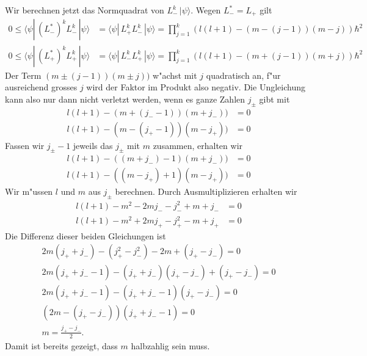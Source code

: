 Wir berechnen jetzt das Normquadrat von $L_-^k\,|\psi\rangle$. Wegen
$L_-^*=L_+$ gilt
\begin{align*}
0
\le
\langle\psi|\, (L_-^*)^kL_-^k\,|\psi\rangle
&=
\langle\psi|\, L_+^kL_-^k\,|\psi\rangle
=
\prod_{j=1}^k(l(l+1)-(m-(j-1))(m-j))\hbar^2
\\
0
\le
\langle\psi|\, (L_+^*)^kL_+^k\,|\psi\rangle
&=
\langle\psi|\, L_-^kL_+^k\,|\psi\rangle
=
\prod_{j=1}^k(l(l+1)-(m+(j-1))(m+j))\hbar^2
\end{align*}
Der Term $(m\pm (j-1))(m\pm j))$ w"achst mit $j$ quadratisch an, 
f"ur ausreichend grosses $j$ wird der Faktor im Produkt also negativ.
Die Ungleichung kann also nur dann nicht verletzt werden, wenn 
es ganze Zahlen $j_\pm$ gibt mit
\begin{align*}
l(l+1)-(m+(j_--1))(m+j_-))&=0
\\
l(l+1)-(m-(j_+-1))(m-j_+))&=0
\end{align*}
Fassen wir $j_\pm-1$ jeweils das $j_\pm$ mit $m$ zusammen, erhalten wir
\begin{align}
l(l+1)-((m+j_-)-1)(m+j_-))&=0
\label{skript:lmjminus}
\\
l(l+1)-((m-j_+)+1)(m-j_+))&=0
\label{skript:lmjplus}
\end{align}
Wir m"ussen $l$ und $m$ aus $j_\pm$ berechnen.
Durch Ausmultiplizieren erhalten wir
\begin{align*}
l(l+1)
-
m^2-2mj_--j_-^2+m+j_-
&=0
\\
l(l+1)
-
m^2+2mj_+-j_+^2-m+j_+
&=0
\end{align*}
Die Differenz dieser beiden Gleichungen ist
\begin{gather*}
2m(j_++j_-)-(j_+^2-j_-^2)-2m+(j_+-j_-)=0
\\
2m(j_++j_--1)-(j_++j_-)(j_+-j_-)+(j_+-j_-)=0
\\
2m(j_++j_--1)-(j_++j_--1)(j_+-j_-)=0
\\
(2m-(j_+-j_-))(j_++j_--1)=0
\\
m=\frac{j_+-j_-}2.
\end{gather*}
Damit ist bereits gezeigt, dass $m$ halbzahlig sein muss.

